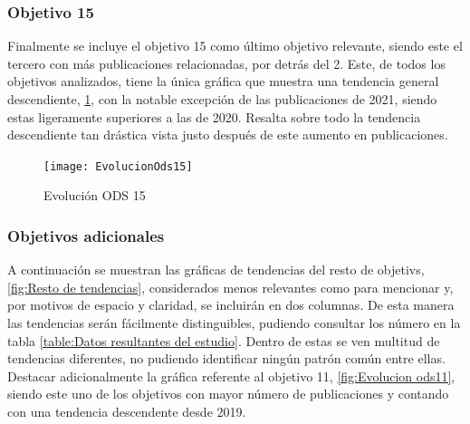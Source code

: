 \subsubsection{Objetivo 15}
Finalmente se incluye el objetivo 15 como último objetivo relevante, siendo este el tercero con más publicaciones relacionadas, por detrás del 2. Este, de todos los objetivos analizados, tiene la única gráfica que muestra una tendencia general descendiente, \cref{fig:Evolucion ODS 15}, con la notable excepción de las publicaciones de 2021, siendo estas ligeramente superiores a las de 2020. Resalta sobre todo la tendencia descendiente tan drástica vista justo después de este aumento en publicaciones. 
\begin{figure}[H]
    \centering
    \texttt{[image: EvolucionOds15]}
    \captionsetup{justification=centering}
    \caption{Evolución ODS 15}
    \label{fig:Evolucion ODS 15}
\end{figure}

\subsubsection{Objetivos adicionales}
A continuación se muestran las gráficas de tendencias del resto de objetivs, \cref{fig:Resto de tendencias}, considerados menos relevantes como para mencionar y, por motivos de espacio y claridad, se incluirán en dos columnas. De esta manera las tendencias serán fácilmente distinguibles, pudiendo consultar los número en la tabla \cref{table:Datos resultantes del estudio}. Dentro de estas se ven multitud de  tendencias diferentes, no pudiendo identificar ningún patrón común entre ellas. Destacar adicionalmente la gráfica referente al objetivo 11, \cref{fig:Evolucion ods11}, siendo este uno de los objetivos con mayor número de publicaciones y contando con  una tendencia descendente desde 2019.

